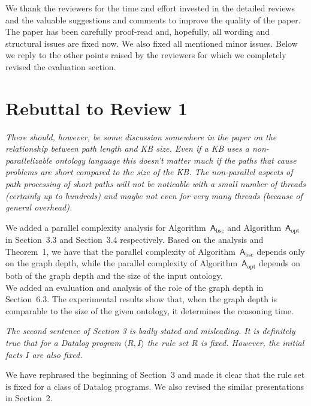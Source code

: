 \documentclass{article}
\let\quoteOld\quote
\let\endquoteOld\endquote
\renewenvironment{quote}{\quoteOld\itshape}{\endquoteOld}
\begin{document}
We thank the reviewers for the time and effort invested in the
detailed reviews and the valuable suggestions and comments to improve
the quality of the paper. The paper has been carefully proof-read and,
hopefully, all wording and structural issues are fixed now. We also
fixed all mentioned minor issues. Below we reply to the other points
raised by the reviewers for which we completely revised the evaluation
section.


\section{Rebuttal to Review 1}

\begin{quote}
There should, however, be some discussion somewhere in the paper on the
relationship between path length and KB size.   Even if a KB uses a
non-parallelizable ontology language this doesn't matter much if the paths
that cause problems are short compared to the size of the KB.  The
non-parallel aspects of path processing of short paths will not be noticable
with a small number of threads (certainly up to hundreds) and maybe not even
for very many threads (because of general overhead).
\end{quote}

We added a parallel complexity analysis for Algorithm~$\mathsf{A}_{\text{bsc}}$
and Algorithm~$\mathsf{A}_{\text{opt}}$
in Section~3.3 and Section~3.4 respectively.
Based on the analysis and Theorem~1, we have that the parallel complexity
of Algorithm~$\mathsf{A}_{\text{bsc}}$ depends only on the graph depth,
while the parallel complexity of Algorithm~$\mathsf{A}_{\text{opt}}$
depends on both of the graph depth and the size of the input ontology.\\

We added an evaluation and analysis of the role of the graph depth in Section~6.3.
The experimental results show that, when the graph depth is comparable to
the size of the given ontology, it determines the reasoning time.


\begin{quote}
  The second sentence of Section 3 is badly stated and misleading.  It is definitely true that for a Datalog program $\langle R, I \rangle$ the rule set $R$ is fixed.  However, the initial facts $I$ are also fixed.
\end{quote}

We have rephrased the beginning of Section~3 and made it clear that the rule set is fixed for a class of Datalog programs.
We also revised the similar presentations in Section~2.
\end{document}

